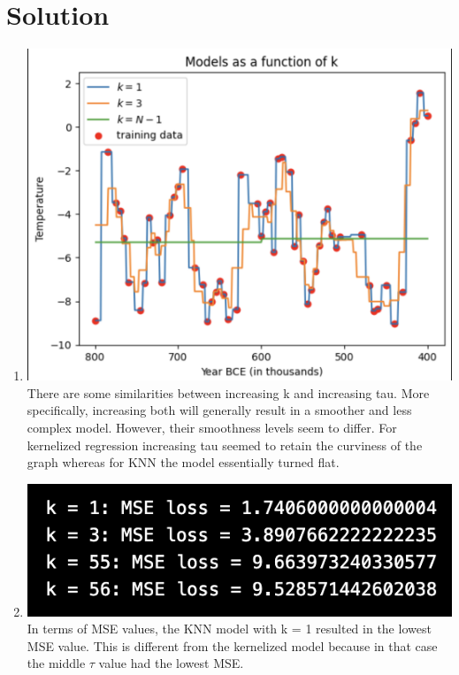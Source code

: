 \documentclass[submit]{harvardml}
\newenvironment{solution}
  {\color{blue}\section*{Solution}}
{}
\begin{document}
\begin{solution}
	\begin{enumerate}
	    \item \includegraphics[width=\textwidth]{q3.1.png} \\
        There are some similarities between increasing k and increasing tau. More specifically, increasing both will generally result in a smoother and less complex model. However, their smoothness levels seem to differ. For kernelized regression increasing tau seemed to retain the curviness of the graph whereas for KNN the model essentially turned flat. 
        \item \includegraphics[width=\textwidth]{q3.2.png} \\
        In terms of MSE values, the KNN model with k = 1 resulted in the lowest MSE value. This is different from the kernelized model because in that case the middle $\tau$ value had the lowest MSE.

\end{enumerate}
\end{solution}
\end{document}
